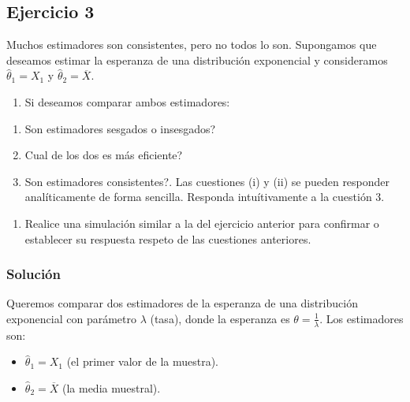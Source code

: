 \documentclass[
]{article}
\providecommand{\tightlist}{%
  \setlength{\itemsep}{0pt}\setlength{\parskip}{0pt}}
\begin{document}
\subsection{Ejercicio 3}\label{ejercicio-3-2}

Muchos estimadores son consistentes, pero no todos lo son. Supongamos que deseamos estimar la esperanza de una distribución exponencial y consideramos \(\hat \theta_1 = X_1\) y \(\hat\theta_2=\overline{X}\).

\begin{enumerate}
\def\labelenumi{\arabic{enumi}.}
\tightlist
\item
  Si deseamos comparar ambos estimadores:
\end{enumerate}

\begin{enumerate}
\def\labelenumi{(\roman{enumi})}
\tightlist
\item
  Son estimadores sesgados o insesgados?
\item
  Cual de los dos es más eficiente?
\item
  Son estimadores consistentes?. Las cuestiones (i) y (ii) se pueden responder analíticamente de forma sencilla. Responda intuítivamente a la cuestión 3.
\end{enumerate}

\begin{enumerate}
\def\labelenumi{\arabic{enumi}.}
\setcounter{enumi}{1}
\tightlist
\item
  Realice una simulación similar a la del ejercicio anterior para confirmar o establecer su respuesta respeto de las cuestiones anteriores.
\end{enumerate}

\subsubsection{Solución}\label{soluciuxf3n-12}

Queremos comparar dos estimadores de la esperanza de una distribución exponencial con parámetro \(\lambda\) (tasa), donde la esperanza es \(\theta = \frac{1}{\lambda}\). Los estimadores son:

\begin{itemize}
\tightlist
\item
  \(\hat\theta_1 = X_1\) (el primer valor de la muestra).
\item
  \(\hat\theta_2 = \overline{X}\) (la media muestral).
\end{itemize}
\end{document}
